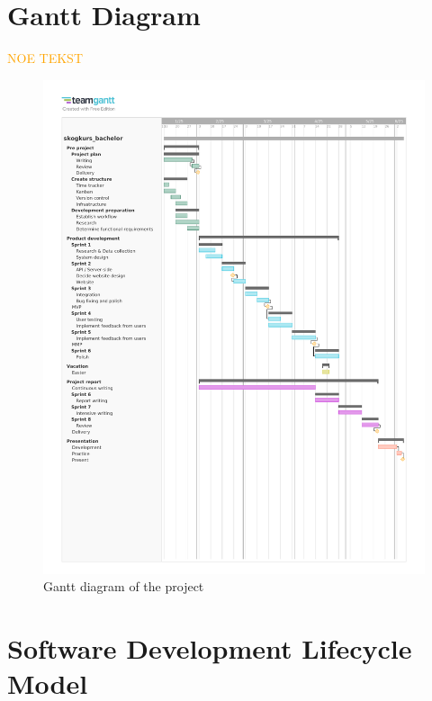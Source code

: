 \section{Gantt Diagram}

\textcolor{orange}{NOE TEKST}
\begin{figure}[h]
    \centering
        \includegraphics[width=1.0\linewidth, trim=0 60mm 0 20mm, clip]{figures/skogkurs_bachelor_gantt.pdf}
    \caption{Gantt diagram of the project}
    \label{fig:gantt_diagram}
\end{figure}

\section{Software Development Lifecycle Model}

